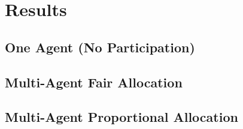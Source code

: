 \chapter{Results}
\label{Results}

\section{One Agent (No Participation)}

\section{Multi-Agent Fair Allocation}

\section{Multi-Agent Proportional Allocation}
